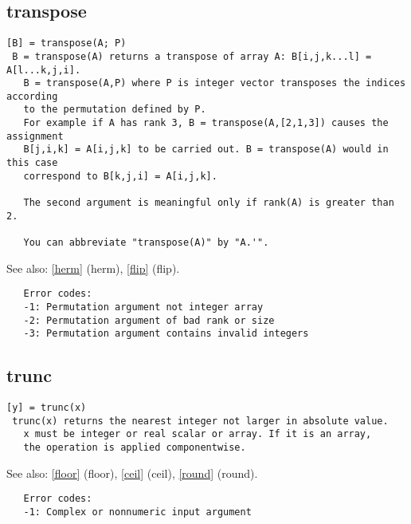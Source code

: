 \documentclass[a4paper]{article}
\begin{document}
\subsection{transpose\label{transpose}}

\begin{tscreen}
\begin{verbatim}
[B] = transpose(A; P)
 B = transpose(A) returns a transpose of array A: B[i,j,k...l] = A[l...k,j,i].
   B = transpose(A,P) where P is integer vector transposes the indices according
   to the permutation defined by P.
   For example if A has rank 3, B = transpose(A,[2,1,3]) causes the assignment
   B[j,i,k] = A[i,j,k] to be carried out. B = transpose(A) would in this case
   correspond to B[k,j,i] = A[i,j,k].

   The second argument is meaningful only if rank(A) is greater than 2.
   
   You can abbreviate "transpose(A)" by "A.'".
\end{verbatim}

See also: \ref{herm} {(herm)}, \ref{flip} {(flip)}.
\begin{verbatim}
   Error codes:
   -1: Permutation argument not integer array
   -2: Permutation argument of bad rank or size
   -3: Permutation argument contains invalid integers 
\end{verbatim}
\end{tscreen}





\subsection{trunc\label{trunc}}

\begin{tscreen}
\begin{verbatim}
[y] = trunc(x)
 trunc(x) returns the nearest integer not larger in absolute value.
   x must be integer or real scalar or array. If it is an array,
   the operation is applied componentwise.
\end{verbatim}

See also: \ref{floor} {(floor)}, \ref{ceil} {(ceil)}, \ref{round} {(round)}.
\begin{verbatim}
   Error codes:
   -1: Complex or nonnumeric input argument 
\end{verbatim}
\end{tscreen}
\end{document}
